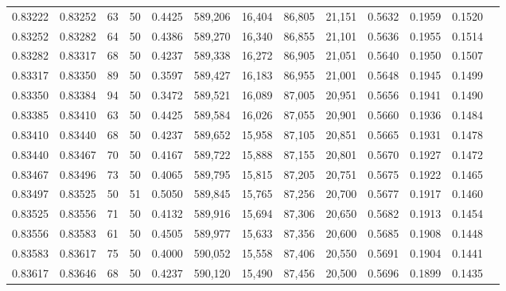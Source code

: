 \begin{tabular}{rrrrrrrrrrrrr}
0.83222 & 0.83252 &    63 &  50 &                                     0.4425 & 589,206 &  16,404 &  86,805 &  21,151 & 0.5632 & 0.1959 & 0.1520 \\
0.83252 & 0.83282 &    64 &  50 &                                     0.4386 & 589,270 &  16,340 &  86,855 &  21,101 & 0.5636 & 0.1955 & 0.1514 \\
0.83282 & 0.83317 &    68 &  50 &                                     0.4237 & 589,338 &  16,272 &  86,905 &  21,051 & 0.5640 & 0.1950 & 0.1507 \\
0.83317 & 0.83350 &    89 &  50 &                                     0.3597 & 589,427 &  16,183 &  86,955 &  21,001 & 0.5648 & 0.1945 & 0.1499 \\
0.83350 & 0.83384 &    94 &  50 &                                     0.3472 & 589,521 &  16,089 &  87,005 &  20,951 & 0.5656 & 0.1941 & 0.1490 \\
0.83385 & 0.83410 &    63 &  50 &                                     0.4425 & 589,584 &  16,026 &  87,055 &  20,901 & 0.5660 & 0.1936 & 0.1484 \\
0.83410 & 0.83440 &    68 &  50 &                                     0.4237 & 589,652 &  15,958 &  87,105 &  20,851 & 0.5665 & 0.1931 & 0.1478 \\
0.83440 & 0.83467 &    70 &  50 &                                     0.4167 & 589,722 &  15,888 &  87,155 &  20,801 & 0.5670 & 0.1927 & 0.1472 \\
0.83467 & 0.83496 &    73 &  50 &                                     0.4065 & 589,795 &  15,815 &  87,205 &  20,751 & 0.5675 & 0.1922 & 0.1465 \\
0.83497 & 0.83525 &    50 &  51 &                                     0.5050 & 589,845 &  15,765 &  87,256 &  20,700 & 0.5677 & 0.1917 & 0.1460 \\
0.83525 & 0.83556 &    71 &  50 &                                     0.4132 & 589,916 &  15,694 &  87,306 &  20,650 & 0.5682 & 0.1913 & 0.1454 \\
0.83556 & 0.83583 &    61 &  50 &                                     0.4505 & 589,977 &  15,633 &  87,356 &  20,600 & 0.5685 & 0.1908 & 0.1448 \\
0.83583 & 0.83617 &    75 &  50 &                                     0.4000 & 590,052 &  15,558 &  87,406 &  20,550 & 0.5691 & 0.1904 & 0.1441 \\
0.83617 & 0.83646 &    68 &  50 &                                     0.4237 & 590,120 &  15,490 &  87,456 &  20,500 & 0.5696 & 0.1899 & 0.1435 \\

\end{tabular}
